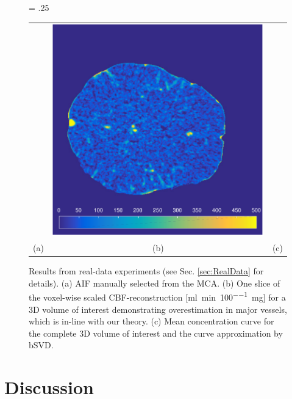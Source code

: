 \documentclass[journal,twocolumn]{IEEEtran}
\newlength{\fwd}
\begin{document}
	\begin{figure}[h!tb]
		\fwd = .25\textwidth
		\centering
		\begin{tabular}{ccc}
		 {\small} & \includegraphics[width = \fwd]{./figs/real_axial160.pdf} & {\small} \\
		 (a) & (b) & (c) 
		\end{tabular}
		\caption{Results from real-data experiments (see Sec. \ref{sec:RealData} for details). (a) AIF manually selected from the MCA. (b) One slice of the voxel-wise scaled CBF-reconstruction [\si{\milli\litre\per\minute\per100\milli\gram}] for a 3D volume of interest demonstrating overestimation in major vessels, which is in-line with our theory. (c) Mean concentration curve for the complete 3D volume of interest and the curve approximation by bSVD.}\label{fig:RealData}
	\end{figure}


	
	
	\section{Discussion}\label{sec:conclusion}
\end{document}
